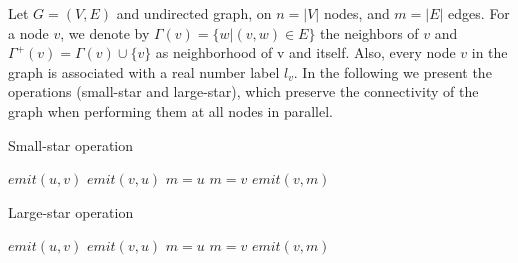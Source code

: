 Let $G = (V,E)$ and undirected graph, on $n = |V|$ nodes, and $m = |E|$ edges. For a node $v$, we denote by $\Gamma(v) = \{w|(v,w) \in E\}$ the neighbors of $v$ and $\Gamma^{+}(v) = \Gamma(v) \cup \{v\}$ as neighborhood of v and itself. Also, every node $v$ in the graph is associated with a real number label $l_{v}$. In the following we present the operations (small-star and large-star), which preserve the connectivity of the graph when performing them at all nodes in parallel.

\begin{algorithm}[!h]
        \caption{Small-star operation}
        \label{algo:small_star}
        \begin{algorithmic}[1]
                                \State $emit(u, v)$  
                        \Else
                                \State $emit(v, u)$  
                        \EndIf
                \EndFunction
                        \State $m = u$
                                        \State $m = v$
                                \EndIf
			\EndFor
                                \State $emit(v, m)$
                        \EndFor
                \EndFunction
        \end{algorithmic}
\end{algorithm}


\begin{algorithm}[!h]
        \caption{Large-star operation}
        \label{algo:large_star}
        \begin{algorithmic}[1]
                        \State $emit(u, v)$
                        \State $emit(v, u)$
                \EndFunction
                        \State $m = u$
                                        \State $m = v$
                                \EndIf
                        \EndFor
                                        \State $emit(v, m)$
                                \EndIf
                        \EndFor
                \EndFunction
        \end{algorithmic}
\end{algorithm}

